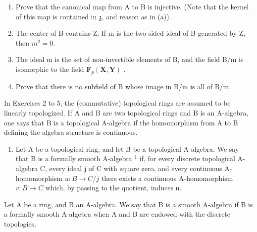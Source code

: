 \begin{enumerate}
\def\labelenumi{\alph{enumi})}
\setcounter{enumi}{3}
\item
  Prove that the canonical map from A to B is injective. (Note that the kernel of this map is contained in \(\mathfrak{z}\), and reason as in (a)).
\item
  The center of B contains Z. If m is the two-sided ideal of B generated by Z, then \(m^{2} = 0\).
\item
  The ideal m is the set of non-invertible elements of B, and the field B/m is isomorphic to the field \(\mathbf{F}_{p}(\mathbf{X}, \mathbf{Y})\) .
\item
  Prove that there is no subfield of B whose image in B/m is all of B/m.
\end{enumerate}

In Exercises 2 to 5, the (commutative) topological rings are assumed to be linearly topologized. If A and B are two topological rings and B is an A-algebra, one says that B is a topological A-algebra if the homomorphism from A to B defining the algebra structure is continuous.

\begin{enumerate}
\def\labelenumi{\arabic{enumi})}
\setcounter{enumi}{1}
\tightlist
\item
  Let A be a topological ring, and let B be a topological A-algebra. We say that B is a formally smooth A-algebra \(^{1}\) if, for every discrete topological A-algebra C, every ideal j of C with square zero, and every continuous A-homomorphism \(u: B \to C/j\) there exists a continuous A-homomorphism \(v: B \to C\) which, by passing to the quotient, induces u.
\end{enumerate}

Let A be a ring, and B an A-algebra. We say that B is a smooth A-algebra if B is a formally smooth A-algebra when A and B are endowed with the discrete topologies.

